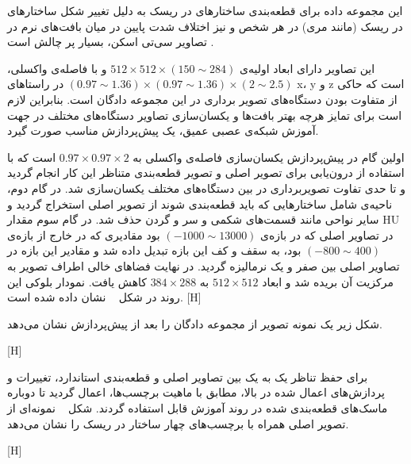 این مجموعه داده برای قطعه‌بندی ساختارهای در ریسک به دلیل تغییر شکل ساختار‌های در ریسک (مانند مری) در هر شخص و نیز اختلاف شدت پایین در میان بافت‌های نرم در تصاویر سی‌تی اسکن، بسیار پر چالش است .

این تصاویر دارای ابعاد اولیه‌ی $512\times512\times(150\sim 284)$ و با فاصله‌ی واکسلی،
 $(0.97\sim1.36)\times(0.97\sim1.36)\times(2\sim2.5)$
 در راستاهای x، y و z است که حاکی از متفاوت بودن دستگاه‌های تصویر برداری در این مجموعه دادگان است. بنابراین لازم است برای تمایز هرچه بهتر بافت‌ها و یکسان‌سازی تصاویر دستگاه‌های مختلف در جهت آموزش شبکه‌ی عصبی عمیق، یک پیش‌پردازش مناسب صورت گیرد.
 
اولین گام در پیش‌پردازش یکسان‌سازی فاصله‌ی واکسلی به $0.97\times0.97\times2$ است که با استفاده از درون‌یابی برای تصویر اصلی و تصویر قطعه‌بندی متناظر این کار انجام گردید و تا حدی تفاوت تصویربرداری در بین دستگاه‌های مختلف یکسان‌سازی شد. در گام دوم، ناحیه‌ی شامل ساختارهایی که باید قطعه‌بندی شوند از تصویر اصلی استخراج گردید و سایر نواحی مانند قسمت‌های شکمی و سر و گردن حذف شد. در گام سوم مقدار HU در تصاویر اصلی که در بازه‌ی $(-1000\sim 13000)$ بود مقادیری که در خارج از بازه‌ی $(-800\sim 400)$ بود، به سقف و کف این بازه تبدیل داده شد و مقادیر این بازه در تصاویر اصلی بین صفر و یک نرمالیزه گردید. در نهایت فضاهای خالی اطراف تصویر به مرکزیت آن بریده شد و ابعاد $512\times512$ به $384\times288$ کاهش یافت. نمودار بلوکی این روند در شکل ~ نشان داده شده است.
[H]

شکل زیر یک نمونه تصویر از مجموعه دادگان را بعد از پیش‌پردازش نشان می‌دهد.

[H]

برای حفظ تناظر یک به یک بین تصاویر اصلی و قطعه‌بندی استاندارد، تغییرات و پردازش‌های اعمال شده در بالا، مطابق با ماهیت برچسب‌ها، اعمال گردید تا دوباره ماسک‌های قطعه‌بندی شده در روند آموزش قابل استفاده گردند. شکل ~ نمونه‌ای از تصویر اصلی همراه با برچسب‌های چهار ساختار در ریسک را نشان می‌دهد.

[H]


